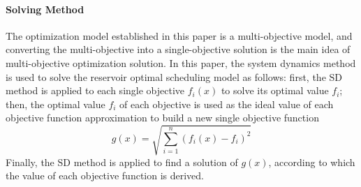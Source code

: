 \paragraph{Solving Method}
The optimization model established in this paper is a multi-objective model, and converting the multi-objective into a single-objective solution is the main idea of multi-objective optimization solution. In this paper, the system dynamics method is used to solve the reservoir optimal scheduling model as follows: first, the SD method is applied to each single objective $f_i(x)$ to solve its optimal value $f_i$; then, the optimal value $f_i$ of each objective is used as the ideal value of each objective function approximation to build a new single objective function
\begin{equation}
  g(x)=\sqrt{\sum^n_{i=1}(f_i(x)-f_i)^2}
\end{equation}
Finally, the SD method is applied to find a solution of $g(x)$, according to which the value of each objective function is derived.
